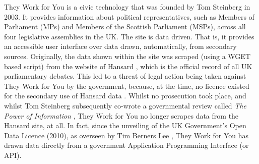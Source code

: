 They Work for You is a civic technology that was founded by Tom Steinberg \cite{tom-steinberg} in 2003.
It provides information about political representatives, such as Members of Parliament (MPs) and Members of the Scottish Parliament (MSPs), across all four legislative assemblies in the UK.
The site is data driven.
That is, it provides an accessible user interface over data drawn, automatically, from secondary sources.
Originally, the data shown within the site was scraped (using a WGET \cite{wget} based script) from the website of Hansard \cite{hansard}, which is the official record of all UK parliamentary debates.
This led to a threat of legal action being taken against They Work for You by the government, because, at the time, no licence existed for the secondary use of Hansard data \cite{they-work-for-you-controversies}.
Whilst no prosecution took place, and whilst Tom Steinberg subsequently co-wrote a governmental review called \emph{The Power of Information} \cite{power-of-information}, They Work for You
no longer scrapes data from the Hansard site, at all.
In fact, since the unveiling of the UK Government's Open Data Licence \cite{open-data-licence} (2010), as overseen by Tim Berners Lee \cite{tim-berners-lee}, They Work for You has drawn data directly from a government Application Programming Interface \cite{api} (or API).